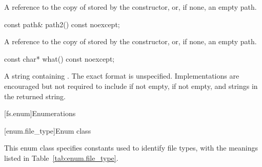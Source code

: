 \begin{itemdescr}
\pnum
\returns A reference to the copy of  stored by the
  constructor, or, if none, an empty path.
\end{itemdescr}

\begin{itemdecl}
const path& path2() const noexcept;
\end{itemdecl}

\begin{itemdescr}
\pnum
\returns A reference to the copy of  stored by the
  constructor, or, if none, an empty path.
\end{itemdescr}

\begin{itemdecl}
const char* what() const noexcept;
\end{itemdecl}

\begin{itemdescr}
\pnum
\returns A string containing . The exact format is unspecified.
  Implementations are encouraged but not required to include 
  if not empty,  if not empty, and  strings in the returned
  string.
\end{itemdescr}

[fs.enum]{Enumerations}

[enum.file_type]{Enum class }

\pnum
This enum class specifies constants used to identify file types,
with the meanings listed in Table~\ref{tab:enum.file_type}.

